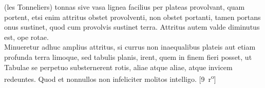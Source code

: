 \noindent (les Tonneliers) tonnas sive vasa lignea facilius per plateas provolvant, quam portent, etsi enim attritus\protect{} obstet provolventi, non obstet portanti, tamen portans onus sustinet, quod cum provolvis sustinet terra. Attritus\protect{} autem valde diminutus est, ope rotae.\\
\indent Minueretur adhuc amplius attritus\protect{}, si currus non inaequalibus plateis aut etiam profunda terra limoque, sed tabulis planis, irent, quem in finem fieri posset, ut Tabulae se perpetuo substernerent rotis, aliae atque aliae, atque invicem redeuntes. %
Quod et nonnullos non infeliciter molitos intelligo. %
[9~r\textsuperscript{o}]
\pend 
\count{}
\count{}
\pstart